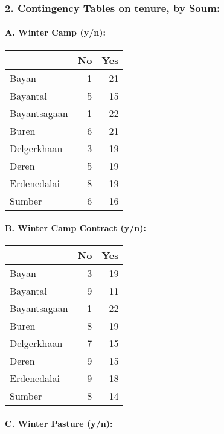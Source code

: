 \documentclass[
]{article}
\begin{document}
\subsubsection{2. Contingency Tables on tenure, by
Soum:}\label{contingency-tables-on-tenure-by-soum}

\paragraph{A. Winter Camp (y/n):}\label{a.-winter-camp-yn}

\begin{longtable}[]{@{}lrr@{}}
\toprule\noalign{}
& No & Yes \\
\midrule\noalign{}
\endhead
\bottomrule\noalign{}
\endlastfoot
Bayan & 1 & 21 \\
Bayantal & 5 & 15 \\
Bayantsagaan & 1 & 22 \\
Buren & 6 & 21 \\
Delgerkhaan & 3 & 19 \\
Deren & 5 & 19 \\
Erdenedalai & 8 & 19 \\
Sumber & 6 & 16 \\
\end{longtable}

\paragraph{B. Winter Camp Contract
(y/n):}\label{b.-winter-camp-contract-yn}

\begin{longtable}[]{@{}lrr@{}}
\toprule\noalign{}
& No & Yes \\
\midrule\noalign{}
\endhead
\bottomrule\noalign{}
\endlastfoot
Bayan & 3 & 19 \\
Bayantal & 9 & 11 \\
Bayantsagaan & 1 & 22 \\
Buren & 8 & 19 \\
Delgerkhaan & 7 & 15 \\
Deren & 9 & 15 \\
Erdenedalai & 9 & 18 \\
Sumber & 8 & 14 \\
\end{longtable}

\paragraph{C. Winter Pasture (y/n):}\label{c.-winter-pasture-yn}
\end{document}
